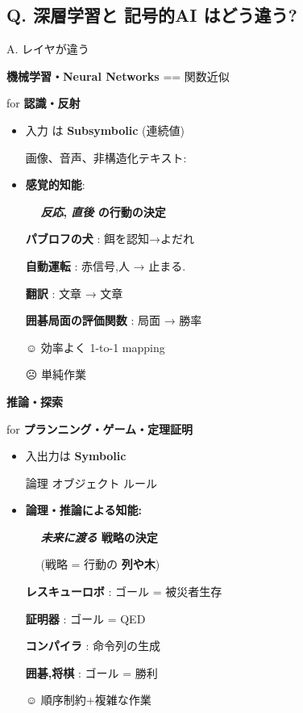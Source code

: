 \subsection{Q. 深層学習と 記号的AI はどう違う?}
\label{sec:orgheadline34}

A. レイヤが違う

\begin{container-fluid}
\begin{row-fluid}
\begin{span6}
\textbf{機械学習・Neural Networks} == 関数近似

for \textbf{認識・反射}
\begin{itemize}
\item 入力 は \textbf{Subsymbolic} (連続値)

画像、音声、非構造化テキスト:
\item \textbf{感覚的知能}:

　 \textbf{\emph{反応}, \emph{直後} の行動の決定}
\begin{smaller}
\textbf{パブロフの犬} : 餌を認知→よだれ

\textbf{自動運転} : 赤信号,人 → 止まる.

\textbf{翻訳} : 文章 → 文章

\textbf{囲碁局面の評価関数} : 局面 → 勝率
\end{smaller}
\begin{larger}
☺ 効率よく 1-to-1 mapping

☹ 単純作業
\end{larger}
\end{itemize}
\end{span6}
\begin{span6}
\textbf{推論・探索}

for \textbf{プランニング・ゲーム・定理証明}
\begin{itemize}
\item 入出力は \textbf{Symbolic}

論理 オブジェクト ルール
\item \textbf{論理・推論による知能:}

　 \textbf{\emph{未来に渡る} 戦略の決定}

　 (戦略 = 行動の \textbf{列や木})
\begin{smaller}
\textbf{レスキューロボ} : ゴール = 被災者生存

\textbf{証明器} : ゴール = QED

\textbf{コンパイラ} : 命令列の生成

\textbf{囲碁,将棋} : ゴール = 勝利
\end{smaller}
\begin{larger}
☺ 順序制約+複雑な作業
\end{larger}
\end{itemize}
\end{span6}
\end{row-fluid}
\end{container-fluid}

